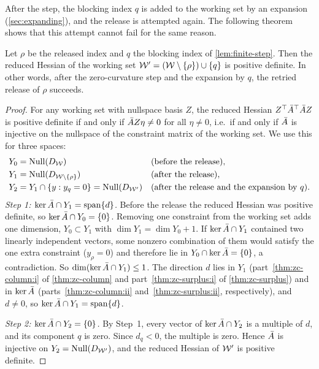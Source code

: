 After the step, the blocking index $q$ is added to the working set by an expansion
(\cref{sec:expanding}), and the release is attempted again. The following theorem shows that
this attempt cannot fail for the same reason.

\begin{theorem} \label{thm:removal}
Let $\rho$ be the released index and $q$ the blocking index of
\cref{lem:finite-step}. Then the reduced Hessian of the working set
$\mathcal{W}' = (\mathcal{W}\setminus\{\rho\})\cup\{q\}$ is positive definite. In other words, after the
zero-curvature step and the expansion by $q$, the retried release of $\rho$ succeeds.
\end{theorem}

\begin{proof}
For any working set with nullspace basis $Z$, the reduced Hessian $Z^\top\bar{A}^\top\bar{A} Z$ is
positive definite if and only if $\bar{A} Z\eta\ne0$ for all $\eta\ne0$, i.e.\ if and only if
$\bar{A}$ is injective on the nullspace of the constraint matrix of the working set. We use
this for three spaces:
\begin{align*}
Y_0 &= \operatorname{Null}(D_{\mathcal{W}}) && \text{(before the release)},\\
Y_1 &= \operatorname{Null}(D_{\mathcal{W}\setminus\{\rho\}}) && \text{(after the release)},\\
Y_2 &= Y_1\cap\{y : y_q = 0\} = \operatorname{Null}(D_{\mathcal{W}'}) && \text{(after the release and the expansion by $q$)}.
\end{align*}
\emph{Step 1: $\ker\bar{A}\cap Y_1 = \operatorname{span}\{d\}$.} Before the release the reduced Hessian was positive
definite, so $\ker\bar{A}\cap Y_0 = \{0\}$. Removing one constraint from the working set adds one
dimension, $Y_0\subset Y_1$ with $\dim Y_1 = \dim Y_0 + 1$. If $\ker\bar{A}\cap Y_1$ contained two
linearly independent vectors, some nonzero combination of them would satisfy the one extra
constraint ($y_\rho = 0$) and therefore lie in $Y_0\cap\ker\bar{A} = \{0\}$, a contradiction. So
$\dim(\ker\bar{A}\cap Y_1)\le1$. The direction $d$ lies in $Y_1$ (part~\ref{thm:zc-column:i} of
\cref{thm:zc-column} and part~\ref{thm:zc-surplus:i} of \cref{thm:zc-surplus}) and in $\ker\bar{A}$
(parts~\ref{thm:zc-column:ii} and~\ref{thm:zc-surplus:ii}, respectively), and $d\ne0$, so
$\ker\bar{A}\cap Y_1 = \operatorname{span}\{d\}$.

\emph{Step 2: $\ker\bar{A}\cap Y_2 = \{0\}$.} By Step~1, every vector of $\ker\bar{A}\cap Y_2$ is a
multiple of $d$, and its component $q$ is zero. Since $d_q<0$, the multiple is zero. Hence
$\bar{A}$ is injective on $Y_2 = \operatorname{Null}(D_{\mathcal{W}'})$, and the reduced Hessian of $\mathcal{W}'$ is
positive definite.
\end{proof}

